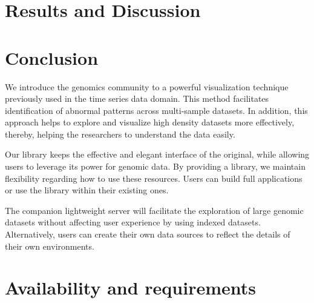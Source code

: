 \documentclass[twocolumn]{bmcart}
\begin{document}
\section*{Results and Discussion}





\section*{Conclusion}


We introduce the genomics community to a powerful visualization technique
previously used in the time series data domain. This method facilitates
identification of abnormal patterns across multi-sample datasets.  In addition, this
approach helps to explore and visualize high density datasets more effectively,
thereby, helping the researchers to understand the data easily.

Our library keeps the effective and elegant interface of the original,
while allowing users to leverage its power for genomic data. By providing a
library, we maintain flexibility regarding how to use these resources. Users
can build full applications or use the library within their existing ones.

The companion lightweight server will facilitate the exploration of large
genomic datasets without affecting user experience by using indexed datasets.
Alternatively, users can create their own data sources to reflect the details
of their own environments.





\section*{Availability and requirements}
\end{document}
